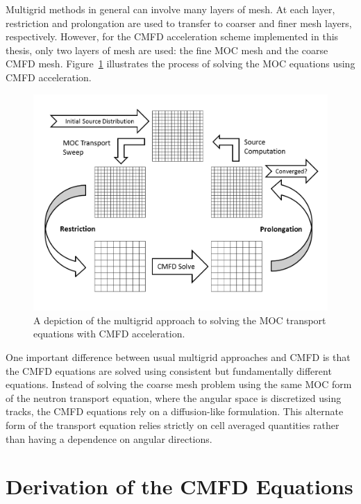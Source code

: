 Multigrid methods in general can involve many layers of mesh. At each layer, restriction and prolongation are used to transfer to coarser and finer mesh layers, respectively. However, for the \ac{CMFD} acceleration scheme implemented in this thesis, only two layers of mesh are used: the fine \ac{MOC} mesh and the coarse \ac{CMFD} mesh. Figure~\ref{fig:multigrid-cmfd} illustrates the process of solving the \ac{MOC} equations using \ac{CMFD} acceleration.
\begin{figure}[h!] 
	\centering 
	\includegraphics[width=\linewidth]{figures/multigrid-cmfd.PNG}
	\caption[]{A depiction of the multigrid approach to solving the \ac{MOC} transport equations with \ac{CMFD} acceleration.}
	\label{fig:multigrid-cmfd}
\end{figure}

One important difference between usual multigrid approaches and \ac{CMFD} is that the \ac{CMFD} equations are solved using consistent but fundamentally different equations. Instead of solving the coarse mesh problem using the same \ac{MOC} form of the neutron transport equation, where the angular space is discretized using tracks, the \ac{CMFD} equations rely on a diffusion-like formulation. This alternate form of the transport equation relies strictly on cell averaged quantities rather than having a dependence on angular directions.

\section{Derivation of the CMFD Equations}
\label{sec:cmfd-derivation}

